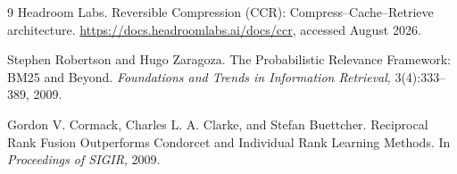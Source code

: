 \begin{thebibliography}{9}
Headroom Labs.
\newblock Reversible Compression (CCR): Compress--Cache--Retrieve architecture.
\newblock \url{https://docs.headroomlabs.ai/docs/ccr}, accessed August 2026.

Stephen Robertson and Hugo Zaragoza.
\newblock The Probabilistic Relevance Framework: BM25 and Beyond.
\newblock \emph{Foundations and Trends in Information Retrieval},
3(4):333--389, 2009.

Gordon V. Cormack, Charles L. A. Clarke, and Stefan Buettcher.
\newblock Reciprocal Rank Fusion Outperforms Condorcet and Individual Rank
Learning Methods.
\newblock In \emph{Proceedings of SIGIR}, 2009.
\end{thebibliography}



